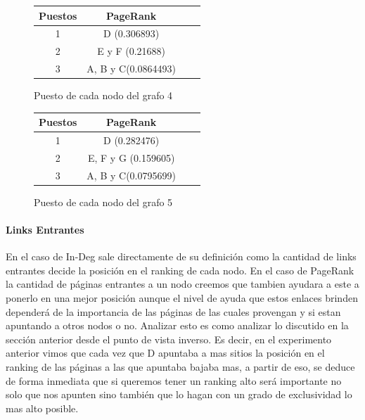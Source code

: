 \begin{figure}[H]
\centering
\begin{minipage}{0.48\textwidth}
\centering

\begin{tabular}{| c | c | c | c |}
  \hline
  Puestos & PageRank\\ \hline \hline
  1 & D (0.306893)\\ \hline
  2 & E y F (0.21688)\\ \hline
  3 & A, B y C(0.0864493)\\ \hline
\end{tabular}
  \caption{\footnotesize{Puesto de cada nodo del grafo 4}}
  \label{fig:Rankings}

\end{minipage}
\hspace{0.02\textwidth}
\begin{minipage}{0.48\textwidth}
  \centering

\begin{tabular}{| c | c | c | c |}
  \hline
  Puestos & PageRank\\ \hline \hline
  1 & D (0.282476)\\ \hline
  2 & E, F y G (0.159605)\\ \hline
  3 & A, B y C(0.0795699)\\ \hline
\end{tabular}
  \caption{\footnotesize{Puesto de cada nodo del grafo 5}}
  \label{fig:Rankings}

\end{minipage}
\end{figure}


\paragraph{Links Entrantes}

En el caso de In-Deg sale directamente de su definición como la cantidad de links entrantes decide la posición en el ranking de cada nodo. En el caso de PageRank la cantidad de páginas entrantes a un nodo creemos que tambien ayudara a este a ponerlo en una mejor posición aunque el nivel de ayuda que estos enlaces brinden dependerá de la importancia de las páginas de las cuales provengan y si estan apuntando a otros nodos o no. Analizar esto es como analizar lo discutido en la sección anterior desde el punto de vista inverso. Es decir, en el experimento anterior vimos que cada vez que D apuntaba a mas sitios la posición en el ranking de las páginas a las que apuntaba bajaba mas, a partir de eso, se deduce de forma inmediata que si queremos tener un ranking alto será importante no solo que nos apunten sino también que lo hagan con un grado de exclusividad lo mas alto posible.

